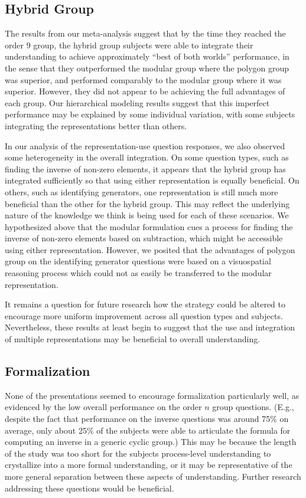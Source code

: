 \documentclass[man,10pt]{apa6}
\begin{document}
\subsection{Hybrid Group}
The results from our meta-analysis suggest that by the time they reached the order 9 group, the hybrid group subjects were able to integrate their understanding to achieve approximately ``best of both worlds'' performance, in the sense that they outperformed the modular group where the polygon group was superior, and performed comparably to the modular group where it was superior. However, they did not appear to be achieving the full advantages of each group. Our hierarchical modeling results suggest that this imperfect performance may be explained by some individual variation, with some subjects integrating the representations better than others. \par 
In our analysis of the representation-use question responses, we also observed some heterogeneity in the overall integration. On some question types, such as finding the inverse of non-zero elements, it appears that the hybrid group has integrated sufficiently so that using either representation is equally beneficial. On others, such as identifying generators, one representation is still much more beneficial than the other for the hybrid group. This may reflect the underlying nature of the knowledge we think is being used for each of these scenarios. We hypothesized above that the modular formulation cues a process for finding the inverse of non-zero elements based on subtraction, which might be accessible using either representation. However, we posited that the advantages of polygon group on the identifying generator questions were based on a visuospatial reasoning process which could not as easily be transferred to the modular representation. \par 
It remains a question for future research how the strategy could be altered to encourage more uniform improvement across all question types and subjects. Nevertheless, these results at least begin to suggest that the use and integration of multiple representations may be beneficial to overall understanding. 
\subsection{Formalization}
None of the presentations seemed to encourage formalization particularly well, as evidenced by the low overall performance on the order $n$ group questions. (E.g., despite the fact that performance on the inverse questions was around 75\% on average, only about 25\% of the subjects were able to articulate the formula for computing an inverse in a generic cyclic group.) This may be because the length of the study was too short for the subjects process-level understanding to crystallize into a more formal understanding, or it may be representative of the more general separation between these aspects of understanding. Further research addressing these questions would be beneficial. 
\end{document}
